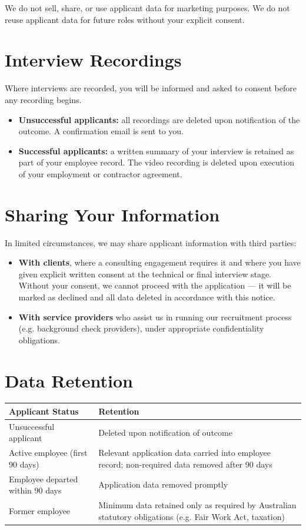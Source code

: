 \documentclass[11pt]{article}
\begin{document}
We do not sell, share, or use applicant data for marketing purposes. We do not reuse applicant data for future roles without your explicit consent.

\section{Interview Recordings}

Where interviews are recorded, you will be informed and asked to consent before any recording begins.

\begin{itemize}
\item \textbf{Unsuccessful applicants:} all recordings are deleted upon notification of the outcome. A confirmation email is sent to you.
\item \textbf{Successful applicants:} a written summary of your interview is retained as part of your employee record. The video recording is deleted upon execution of your employment or contractor agreement.
\end{itemize}

\section{Sharing Your Information}

In limited circumstances, we may share applicant information with third parties:

\begin{itemize}
\item \textbf{With clients}, where a consulting engagement requires it and where you have given explicit written consent at the technical or final interview stage. Without your consent, we cannot proceed with the application --- it will be marked as declined and all data deleted in accordance with this notice.
\item \textbf{With service providers} who assist us in running our recruitment process (e.g. background check providers), under appropriate confidentiality obligations.
\end{itemize}

\section{Data Retention}

\begin{longtable}{|>{\raggedright\arraybackslash}p{}|>{\raggedright\arraybackslash}p{}|}
\hline
\textbf{Applicant Status} & \textbf{Retention} \\
\hline
Unsuccessful applicant & Deleted upon notification of outcome \\
\hline
Active employee (first 90 days) & Relevant application data carried into employee record; non-required data removed after 90 days \\
\hline
Employee departed within 90 days & Application data removed promptly \\
\hline
Former employee & Minimum data retained only as required by Australian statutory obligations (e.g. Fair Work Act, taxation) \\
\hline
\end{longtable}
\end{document}
